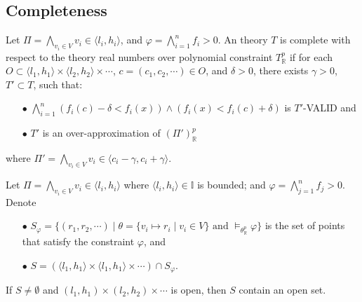 \subsection{Completeness}
\begin{definition} \label{def:OT-complete}
\sloppy
Let $\Pi = \bigwedge\limits_{v_i \in V} v_i \in \langle l_i, h_i \rangle$, and ${\varphi = \bigwedge\limits_{i=1}^n f_i > 0}$. An theory $T$ is complete with respect to the theory real numbers over polynomial constraint $T^p_\mathbb{R}$ if for each ${O \subset \langle l_1, h_1 \rangle \times \langle l_2, h_2 \rangle \times \cdots}$, ${c = (c_1, c_2, \cdots) \in O}$, and $\delta > 0$, there exists $\gamma > 0$, $T' \subset T$, such that:
\begin{itemize}
\item[$\bullet$]$\bigwedge\limits_{i=1}^n(f_i(c)-\delta < f_i(x)) \wedge (f_i(x) < f_i(c) + \delta)$ is $T'$-VALID and
\item[$\bullet$] $T'$ is an over-approximation of $(\Pi')^p_\mathbb{R}$
\end{itemize} 
where ${\Pi' = \bigwedge\limits_{v_i \in V} v_i \in \langle c_i - \gamma, c_i + \gamma \rangle}$.
\end{definition}

\begin{lemma} \label{lem:sat-complete}
Let $\Pi = \bigwedge\limits_{v_i \in V} v_i \in \langle l_i, h_i \rangle$ where $\langle l_i, h_i \rangle \in \mathbb{I}$ is bounded; and ${\varphi = \bigwedge\limits_{j = 1}^n f_j > 0}$. Denote 
\begin{itemize}
\item [$\bullet$] $S_\varphi = \{(r_1, r_2, \cdots) \mid \theta = \{v_i \mapsto r_i \mid v_i \in V \} \text{ and } \models_{\theta^p_\mathbb{R}}\varphi \}$ is the set of points that satisfy the constraint $\varphi$, and
\item [$\bullet$] $S = (\langle l_1, h_1 \rangle \times \langle l_1, h_1 \rangle \times \cdots) \cap S_\varphi$.
\end{itemize}
If $S \neq \emptyset$ and $(l_1, h_1) \times (l_2, h_2) \times \cdots$ is open, then $S$ contain an open set.
\end{lemma}

